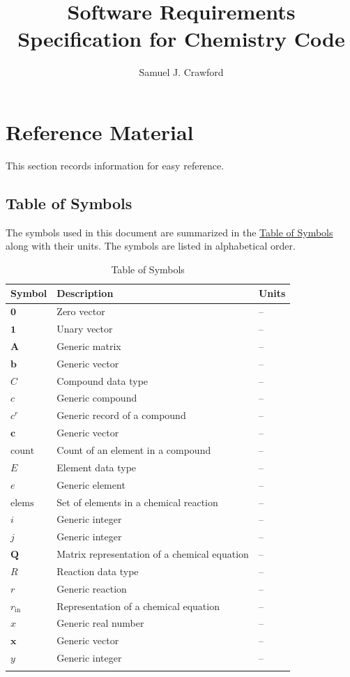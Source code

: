 \documentclass[12pt]{article}
\title{Software Requirements Specification for Chemistry Code}
\author{Samuel J. Crawford}
\begin{document}
\maketitle
\tableofcontents
\newpage
\section{Reference Material}
\label{Sec:RefMat}
This section records information for easy reference.

\subsection{Table of Symbols}
\label{Sec:ToS}
The symbols used in this document are summarized in the \hyperref[Table:ToS]{Table of Symbols} along with their units. The symbols are listed in alphabetical order.

\begin{longtable}{l l l}
\toprule
\textbf{Symbol} & \textbf{Description} & \textbf{Units}
\\
\midrule
\endhead
$\symbf{0}$ & Zero vector & --
\\
$\symbf{1}$ & Unary vector & --
\\
$\symbf{A}$ & Generic matrix & --
\\
$\symbf{b}$ & Generic vector & --
\\
$C$ & Compound data type & --
\\
$c$ & Generic compound & --
\\
${c^{r}}$ & Generic record of a compound & --
\\
$\symbf{c}$ & Generic vector & --
\\
$\text{count}$ & Count of an element in a compound & --
\\
$E$ & Element data type & --
\\
$e$ & Generic element & --
\\
$\text{elems}$ & Set of elements in a chemical reaction & --
\\
$i$ & Generic integer & --
\\
$j$ & Generic integer & --
\\
$\symbf{Q}$ & Matrix representation of a chemical equation & --
\\
$R$ & Reaction data type & --
\\
$r$ & Generic reaction & --
\\
${r_{\text{in}}}$ & Representation of a chemical equation & --
\\
$x$ & Generic real number & --
\\
$\symbf{x}$ & Generic vector & --
\\
$y$ & Generic integer & --
\\
\bottomrule
\caption{Table of Symbols}
\label{Table:ToS}
\end{longtable}
\end{document}
